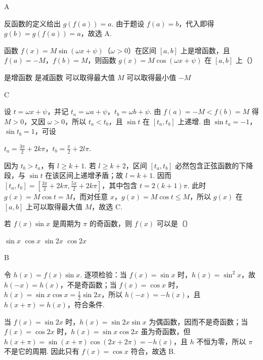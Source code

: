 \begin{answer}
A
\end{answer}

\begin{solution}
反函数的定义给出 \(g(f(a))=a\). 由于题设 \(f(a)=b\)，代入即得
\(g(b)=g(f(a))=a\)，故选 A.
\end{solution}

\begin{problem}
函数 \(f(x)=M\sin(\omega x+\psi)\)（\(\omega>0\)）在区间 \([a,b]\) 上是增函数，且 \(f(a)=-M\)，\(f(b)=M\)，则函数 \(g(x)=M\cos(\omega x+\psi)\) 在 \([a,b]\) 上（\quad）

\choices
    {是增函数}
    {是减函数}
    {可以取得最大值 \(M\)}
    {可以取得最小值 \(-M\)}
\end{problem}

\begin{answer}
C
\end{answer}

\begin{solution}
设 \(t=\omega x+\psi\)，并记 \(t_a=\omega a+\psi\)，\(t_b=\omega b+\psi\). 由 \(f(a)=-M<f(b)=M\) 得 \(M>0\)，又因 \(\omega>0\)，所以 \(t_a<t_b\)，且 \(\sin t\) 在 \([t_a,t_b]\) 上递增. 由 \(\sin t_a=-1\)，\(\sin t_b=1\)，可设

\(t_a=\frac{3\pi}{2}+2k\pi\)，\(t_b=\frac{\pi}{2}+2l\pi\).

因为 \(t_b>t_a\)，有 \(l\ge k+1\). 若 \(l\ge k+2\)，区间 \([t_a,t_b]\) 必然包含正弦函数的下降段，与 \(\sin t\) 在该区间上递增矛盾；故 \(l=k+1\). 因而 \([t_a,t_b]=[\frac{3\pi}{2}+2k\pi,\frac{5\pi}{2}+2k\pi]\)，其中包含 \(t=2(k+1)\pi\). 此时
\(g(x)=M\cos t=M\)，而对任意 \(x\)，\(g(x)=M\cos t\le M\)，所以 \(g(x)\) 在 \([a,b]\) 上可以取得最大值 \(M\)，故选 C.
\end{solution}

\begin{problem}
若 \(f(x)\sin x\) 是周期为 \(\pi\) 的奇函数，则 \(f(x)\) 可以是（\quad）

\choices
    {\(\sin x\)}
    {\(\cos x\)}
    {\(\sin 2x\)}
    {\(\cos 2x\)}
\end{problem}

\begin{answer}
B
\end{answer}

\begin{solution}
令 \(h(x)=f(x)\sin x\). 逐项检验：当 \(f(x)=\sin x\) 时，\(h(x)=\sin^2x\)，故 \(h(-x)=h(x)\)，不是奇函数；当 \(f(x)=\cos x\) 时，
\(h(x)=\sin x\cos x=\frac12\sin 2x\)，所以 \(h(-x)=-h(x)\)，且 \(h(x+\pi)=h(x)\)，符合条件.

当 \(f(x)=\sin 2x\) 时，\(h(x)=\sin 2x\sin x\) 为偶函数，因而不是奇函数；当 \(f(x)=\cos 2x\) 时，\(h(x)=\sin x\cos 2x\) 虽为奇函数，但
\(h(x+\pi)=\sin(x+\pi)\cos(2x+2\pi)=-h(x)\)，且 \(h\) 不恒为零，所以 \(\pi\) 不是它的周期. 因此只有 \(f(x)=\cos x\) 符合，故选 B.
\end{solution}

